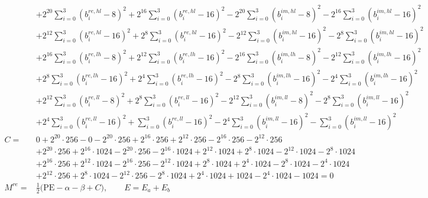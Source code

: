 \documentclass[fleqn]{article}
\begin{document}
{\[{\begin{aligned}
  & + 2^{20}\!\sum_{i=0}^{3}(b_i^{re,hl}{-}8)^2 + 2^{16}\!\sum_{i=0}^{3}(b_i^{re,hl}{-}16)^2 - 2^{20}\!\sum_{i=0}^{3}(b_i^{im,hl}{-}8)^2 - 2^{16}\!\sum_{i=0}^{3}(b_i^{im,hl}{-}16)^2 \\
  & + 2^{12}\!\sum_{i=0}^{3}(b_i^{re,hl}{-}16)^2 + 2^{8}\!\sum_{i=0}^{3}(b_i^{re,hl}{-}16)^2 - 2^{12}\!\sum_{i=0}^{3}(b_i^{im,hl}{-}16)^2 - 2^{8}\!\sum_{i=0}^{3}(b_i^{im,hl}{-}16)^2 \\
  & + 2^{16}\!\sum_{i=0}^{3}(b_i^{re,lh}{-}8)^2 + 2^{12}\!\sum_{i=0}^{3}(b_i^{re,lh}{-}16)^2 - 2^{16}\!\sum_{i=0}^{3}(b_i^{im,lh}{-}8)^2 - 2^{12}\!\sum_{i=0}^{3}(b_i^{im,lh}{-}16)^2 \\
  & + 2^{8}\!\sum_{i=0}^{3}(b_i^{re,lh}{-}16)^2 + 2^{4}\!\sum_{i=0}^{3}(b_i^{re,lh}{-}16)^2 - 2^{8}\!\sum_{i=0}^{3}(b_i^{im,lh}{-}16)^2 - 2^{4}\!\sum_{i=0}^{3}(b_i^{im,lh}{-}16)^2 \\
  & + 2^{12}\!\sum_{i=0}^{3}(b_i^{re,ll}{-}8)^2 + 2^{8}\!\sum_{i=0}^{3}(b_i^{re,ll}{-}16)^2 - 2^{12}\!\sum_{i=0}^{3}(b_i^{im,ll}{-}8)^2 - 2^{8}\!\sum_{i=0}^{3}(b_i^{im,ll}{-}16)^2 \\
  & + 2^{4}\!\sum_{i=0}^{3}(b_i^{re,ll}{-}16)^2 + \sum_{i=0}^{3}(b_i^{re,ll}{-}16)^2 - 2^{4}\!\sum_{i=0}^{3}(b_i^{im,ll}{-}16)^2 - \sum_{i=0}^{3}(b_i^{im,ll}{-}16)^2 \\[0.35em]
C ={}& 0 + 2^{20}\!\cdot\!256 - 0 - 2^{20}\!\cdot\!256 + 2^{16}\!\cdot\!256 + 2^{12}\!\cdot\!256 - 2^{16}\!\cdot\!256 - 2^{12}\!\cdot\!256 \\
  & + 2^{20}\!\cdot\!256 + 2^{16}\!\cdot\!1024 - 2^{20}\!\cdot\!256 - 2^{16}\!\cdot\!1024 + 2^{12}\!\cdot\!1024 + 2^{8}\!\cdot\!1024 - 2^{12}\!\cdot\!1024 - 2^{8}\!\cdot\!1024 \\
  & + 2^{16}\!\cdot\!256 + 2^{12}\!\cdot\!1024 - 2^{16}\!\cdot\!256 - 2^{12}\!\cdot\!1024 + 2^{8}\!\cdot\!1024 + 2^{4}\!\cdot\!1024 - 2^{8}\!\cdot\!1024 - 2^{4}\!\cdot\!1024 \\
  & + 2^{12}\!\cdot\!256 + 2^{8}\!\cdot\!1024 - 2^{12}\!\cdot\!256 - 2^{8}\!\cdot\!1024 + 2^{4}\!\cdot\!1024 + 1024 - 2^{4}\!\cdot\!1024 - 1024 = 0 \\[0.3em]
M^{re} ={}& \tfrac12\big(\mathrm{PE} - \alpha - \beta + C\big), \qquad E = E_a + E_b
\end{aligned}
\;}
\]
}

\medskip
\end{document}
